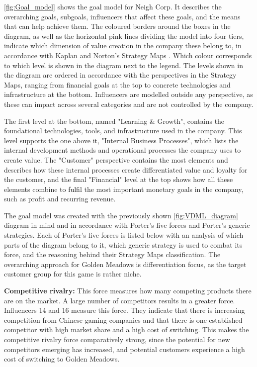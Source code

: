 \documentclass{article}
\begin{document}


\autoref{fig:Goal_model} shows the goal model for Neigh Corp. It describes the overarching goals, subgoals, influencers that affect these goals, and the means that can help achieve them. The coloured borders around the boxes in the diagram, as well as the horizontal pink lines dividing the model into four tiers, indicate which dimension of value creation in the company these belong to, in accordance with Kaplan and Norton's Strategy Maps \cite{kaplan2004strategy}. Which colour corresponds to which level is shown in the diagram next to the legend. The levels shown in the diagram are ordered in accordance with the perspectives in the Strategy Maps, ranging from financial goals at the top to concrete technologies and infrastructure at the bottom. Influencers are modelled outside any perspective, as these can impact across several categories and are not controlled by the company.

The first level at the bottom, named "Learning \& Growth", contains the foundational technologies, tools, and infrastructure used in the company. This level supports the one above it, "Internal Business Processes", which lists the internal development methods and operational processes the company uses to create value. The "Customer" perspective contains the most elements and describes how these internal processes create differentiated value and loyalty for the customer, and the final "Financial" level at the top shows how all these elements combine to fulfil the most important monetary goals in the company, such as profit and recurring revenue.

The goal model was created with the previously shown \autoref{fig:VDML_diagram} diagram in mind and in accordance with Porter's five forces \cite{quickmba_porter} and Porter's generic strategies. Each of Porter's five forces is listed below with an analysis of which parts of the diagram belong to it, which generic strategy is used to combat its force, and the reasoning behind their Strategy Maps classification. The overarching approach for Golden Meadows is differentiation focus, as the target customer group for this game is rather niche.

\textbf{Competitive rivalry:}
This force measures how many competing products there are on the market. A large number of competitors results in a greater force. Influencers 14 and 16 measure this force. They indicate that there is increasing competition from Chinese gaming companies and that there is one established competitor with high market share and a high cost of switching. This makes the competitive rivalry force comparatively strong, since the potential for new competitors emerging has increased, and potential customers experience a high cost of switching to Golden Meadows. 
\end{document}
